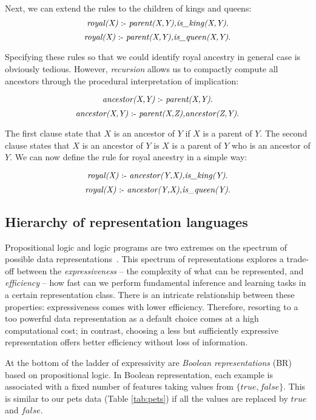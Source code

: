Next, we can extend the rules to the children of kings and queens:
$$ \text{\textit{royal(X)}} \text{ :- } \text{\textit{parent(X,Y),is\_king(X,Y)}}.$$
$$ \text{\textit{royal(X)}} \text{ :- } \text{\textit{parent(X,Y),is\_queen(X,Y)}}.$$

Specifying these rules so that we could identify royal ancestry in general case is obviously tedious.
However, \textit{recursion} allows us to compactly compute all ancestors through the procedural interpretation of implication:

$$ \text{\textit{ancestor(X,Y)}} \text{ :- } \textit{parent(X,Y)}.$$
$$ \text{\textit{ancestor(X,Y)}} \text{ :- } \textit{parent(X,Z),ancestor(Z,Y)}.$$

The first clause state that $X$ is an ancestor of $Y$ if $X$ is a parent of $Y$.
The second clause states that $X$ is an ancestor of $Y$ is $X$ is a parent of $Y$ who is an ancestor of $Y$.
We can now define the rule for royal ancestry in a simple way:

$$ \text{\textit{royal(X)}} \text{ :- } \text{\textit{ancestor(Y,X),is\_king(Y)}}.$$
$$ \text{\textit{royal(X)}} \text{ :- } \text{\textit{ancestor(Y,X),is\_queen(Y)}}.$$












\subsection{Hierarchy of representation languages}



Propositional logic and logic programs are two extremes on the spectrum of possible data representations~\cite{LucRLbook}.
This spectrum of representations explores a trade-off between the \textit{expressiveness} -- the complexity of what can be represented, and \textit{efficiency} -- how fast can we perform fundamental inference and learning tasks in a certain representation class.
There is an intricate relationship between these properties: expressiveness comes with lower efficiency.
Therefore, resorting to a too powerful data representation as a default choice comes at a high computational cost; in contrast, choosing a less but sufficiently expressive representation offers better efficiency  without loss of information.


At the bottom of the ladder of expressivity are \textit{Boolean representations} (BR) based on propositional logic.
In Boolean representation, each example is associated with a fixed number of features taking values from $\{true, false\}$.
This is similar to our pets data (Table \ref{tab:pets})  if all the values are replaced by $true$ and $false$.


